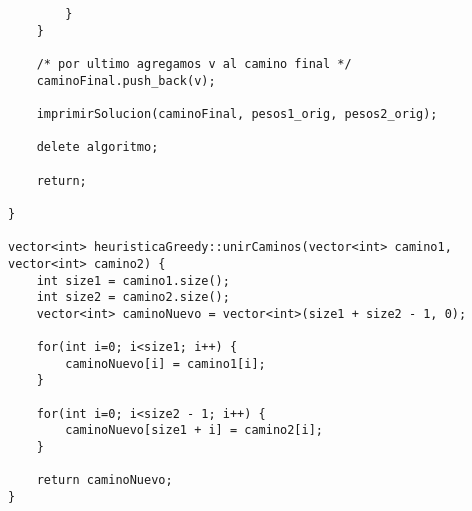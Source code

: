 \begin{lstlisting}
		}
	}

	/* por ultimo agregamos v al camino final */
	caminoFinal.push_back(v);

	imprimirSolucion(caminoFinal, pesos1_orig, pesos2_orig);
	
	delete algoritmo;
	
	return;
	
}

vector<int> heuristicaGreedy::unirCaminos(vector<int> camino1, vector<int> camino2) {
	int size1 = camino1.size();
	int size2 = camino2.size();
	vector<int> caminoNuevo = vector<int>(size1 + size2 - 1, 0);
	
	for(int i=0; i<size1; i++) {
		caminoNuevo[i] = camino1[i];
	}

	for(int i=0; i<size2 - 1; i++) {
		caminoNuevo[size1 + i] = camino2[i];
	}

	return caminoNuevo;
}

\end{lstlisting}